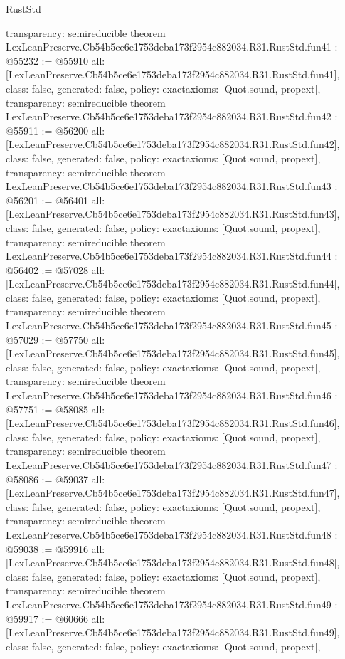 \begin{lexlean}{RustStd}
\begin{coremodule}
{  transparency: semireducible
}
theorem LexLeanPreserve.Cb54b5ce6e1753deba173f2954c882034.R31.RustStd.fun41 : @55232 := @55910 {
  all: [LexLeanPreserve.Cb54b5ce6e1753deba173f2954c882034.R31.RustStd.fun41],
  class: false,
  generated: false,
  policy: exact{axioms: [Quot.sound, propext]},
  transparency: semireducible
}
theorem LexLeanPreserve.Cb54b5ce6e1753deba173f2954c882034.R31.RustStd.fun42 : @55911 := @56200 {
  all: [LexLeanPreserve.Cb54b5ce6e1753deba173f2954c882034.R31.RustStd.fun42],
  class: false,
  generated: false,
  policy: exact{axioms: [Quot.sound, propext]},
  transparency: semireducible
}
theorem LexLeanPreserve.Cb54b5ce6e1753deba173f2954c882034.R31.RustStd.fun43 : @56201 := @56401 {
  all: [LexLeanPreserve.Cb54b5ce6e1753deba173f2954c882034.R31.RustStd.fun43],
  class: false,
  generated: false,
  policy: exact{axioms: [Quot.sound, propext]},
  transparency: semireducible
}
theorem LexLeanPreserve.Cb54b5ce6e1753deba173f2954c882034.R31.RustStd.fun44 : @56402 := @57028 {
  all: [LexLeanPreserve.Cb54b5ce6e1753deba173f2954c882034.R31.RustStd.fun44],
  class: false,
  generated: false,
  policy: exact{axioms: [Quot.sound, propext]},
  transparency: semireducible
}
theorem LexLeanPreserve.Cb54b5ce6e1753deba173f2954c882034.R31.RustStd.fun45 : @57029 := @57750 {
  all: [LexLeanPreserve.Cb54b5ce6e1753deba173f2954c882034.R31.RustStd.fun45],
  class: false,
  generated: false,
  policy: exact{axioms: [Quot.sound, propext]},
  transparency: semireducible
}
theorem LexLeanPreserve.Cb54b5ce6e1753deba173f2954c882034.R31.RustStd.fun46 : @57751 := @58085 {
  all: [LexLeanPreserve.Cb54b5ce6e1753deba173f2954c882034.R31.RustStd.fun46],
  class: false,
  generated: false,
  policy: exact{axioms: [Quot.sound, propext]},
  transparency: semireducible
}
theorem LexLeanPreserve.Cb54b5ce6e1753deba173f2954c882034.R31.RustStd.fun47 : @58086 := @59037 {
  all: [LexLeanPreserve.Cb54b5ce6e1753deba173f2954c882034.R31.RustStd.fun47],
  class: false,
  generated: false,
  policy: exact{axioms: [Quot.sound, propext]},
  transparency: semireducible
}
theorem LexLeanPreserve.Cb54b5ce6e1753deba173f2954c882034.R31.RustStd.fun48 : @59038 := @59916 {
  all: [LexLeanPreserve.Cb54b5ce6e1753deba173f2954c882034.R31.RustStd.fun48],
  class: false,
  generated: false,
  policy: exact{axioms: [Quot.sound, propext]},
  transparency: semireducible
}
theorem LexLeanPreserve.Cb54b5ce6e1753deba173f2954c882034.R31.RustStd.fun49 : @59917 := @60666 {
  all: [LexLeanPreserve.Cb54b5ce6e1753deba173f2954c882034.R31.RustStd.fun49],
  class: false,
  generated: false,
  policy: exact{axioms: [Quot.sound, propext]},
}
\end{coremodule}
\end{lexlean}
